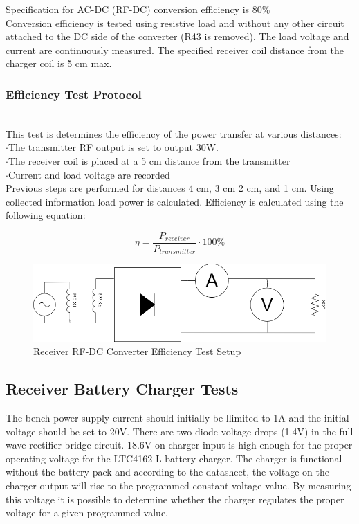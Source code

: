 \documentclass[12pt]{article}
\begin{document}
\noindent
Specification  for AC-DC (RF-DC) conversion efficiency is 80\%\\
 
\noindent
Conversion efficiency is tested using resistive load and without any other circuit attached to the DC side of the converter (R43 is removed). The load voltage and current are continuously  measured.  The specified receiver coil distance from the charger coil is 5 cm max.
\subsubsection*{Efficiency Test Protocol}\hfill \\
\noindent
This test is determines the efficiency of the power transfer at various distances:\\
\indent \indent $\cdot$The transmitter RF output is set to output 30W.\\
\indent \indent $\cdot$The receiver coil is placed at a 5 cm distance from the transmitter\\
\indent \indent $\cdot$Current and load voltage are recorded\\

\noindent
Previous steps are performed for distances 4 cm, 3 cm 2 cm, and 1 cm.  Using collected information load power is calculated.  Efficiency is calculated using the following equation:

\begin{equation}
\eta = \frac{P_{receiver}}{P_{transmitter}} \cdot 100\%
\end{equation}
\hfill
\begin{figure}[h!]
\centering
\includegraphics[width=0.8\linewidth]{RX_EFF_TEST}
\caption{Receiver RF-DC Converter Efficiency Test Setup}
\end{figure}

\subsection{Receiver Battery Charger Tests}

\indent
The bench power supply current should initially be llimited to 1A and the initial voltage should be set to 20V.  There are two diode voltage drops (1.4V) in the full wave rectifier bridge circuit.  18.6V on charger input is high enough for the proper operating voltage for the LTC4162-L battery charger.  The charger is functional without the battery pack and according to the datasheet, the voltage on the charger output will rise to the programmed constant-voltage value. By measuring this voltage it is possible to determine whether the charger regulates the proper voltage for a given programmed value.
\hfill 
\pagebreak
\hfill \\
\end{document}

